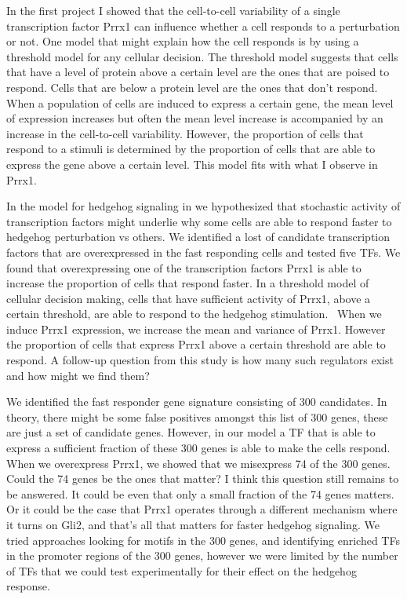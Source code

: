 In the first project I showed that the cell-to-cell variability of a single transcription factor Prrx1 can influence whether a cell responds to a perturbation or not. One model that might explain how the cell responds is by using a threshold model for any cellular decision. The threshold model suggests that cells that have a level of protein above a certain level are the ones that are poised to respond. Cells that are below a protein level are the ones that don't respond. When a population of cells are induced to express a certain gene, the mean level of expression increases but often the mean level increase is accompanied by an increase in the cell-to-cell variability. However, the proportion of cells that respond to a stimuli is determined by the proportion of cells that are able to express the gene above a certain level. This model fits with what I observe in Prrx1.

In the model for hedgehog signaling in \label{Chap:hedgehog} we hypothesized that stochastic activity of transcription factors might underlie why some cells are able to respond faster to hedgehog perturbation vs others. We identified a lost of candidate transcription factors that are overexpressed in the fast responding cells and tested five TFs. We found that overexpressing one of the transcription factors Prrx1 is able to increase the proportion of cells that respond faster. In a threshold model of cellular decision making, cells that have sufficient activity of Prrx1, above a certain threshold, are able to respond to the hedgehog stimulation.  When we induce Prrx1 expression, we increase the mean and variance of Prrx1. However the proportion of cells that express Prrx1 above a certain threshold are able to respond. A follow-up question from this study is how many such regulators exist and how might we find them?

We identified the fast responder gene signature consisting of 300 candidates. In theory, there might be some false positives amongst this list of 300 genes, these are just a set of candidate genes. However, in our model a TF that is able to express a sufficient fraction of these 300 genes is able to make the cells respond. When we overexpress Prrx1, we showed that we misexpress 74 of the 300 genes. Could the 74 genes be the ones that matter? I think this question still remains to be answered. It could be even that only a small fraction of the 74 genes matters. Or it could be the case that Prrx1 operates through a different mechanism where it turns on Gli2, and that's all that matters for faster hedgehog signaling. We tried approaches looking for motifs in the 300 genes, and identifying enriched TFs in the promoter regions of the 300 genes, however we were limited by the number of TFs that we could test experimentally for their effect on the hedgehog response. 


